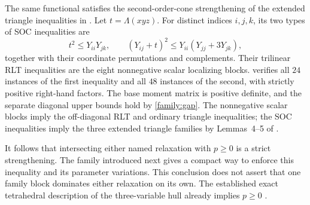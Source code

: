 The same functional satisfies the second-order-cone strengthening of the
extended triangle inequalities in \citet{AnstreicherPuges2025ETRI}.
Let $t=\Lambda(xyz)$. For distinct indices $i,j,k$, its two types of SOC
inequalities are
\begin{equation}
\label{family:ap-soc}
t^2\le Y_{ii}Y_{jk},\qquad
(Y_{ij}+t)^2\le Y_{ii}(Y_{jj}+3Y_{jk}),
\end{equation}
together with their coordinate permutations and complements. Their
trilinear RLT inequalities are the eight nonnegative scalar localizing
blocks.  verifies all $24$ instances of the
first inequality and all $48$ instances of the second, with strictly
positive right-hand factors. The base moment matrix is positive definite,
and the separate diagonal upper bounds hold by \cref{family:gap}.
The nonnegative scalar blocks imply the off-diagonal RLT and ordinary
triangle inequalities; the SOC inequalities imply the three extended
triangle families by Lemmas~4--5 of \citet{AnstreicherPuges2025ETRI}.

It follows that intersecting either named relaxation with $p\ge0$ is a
strict strengthening. The family introduced next gives a compact way to
enforce this inequality and its parameter variations. This conclusion
does not assert that one family block dominates either relaxation on its
own. The established exact tetrahedral description of the three-variable
hull already implies $p\ge0$ \citep{AnstreicherBurer2010}.

